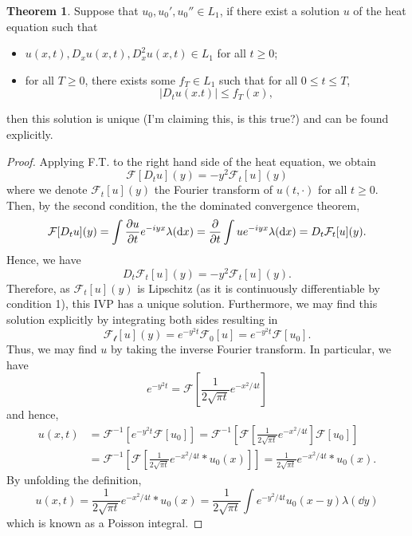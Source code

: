 \documentclass[]{article}
\theoremstyle{definition}
\newtheorem{theorem}{Theorem}
\theoremstyle{definition}
\begin{document}
\begin{theorem}
  Suppose that \(u_0, u_0', u_0'' \in L_1\), if there exist a solution \(u\) of the 
  heat equation such that 
  \begin{itemize}
    \item \(u(x, t), D_x u(x ,t), D^2_x u(x, t) \in L_1\) for all \(t \ge 0\);
    \item for all \(T \ge 0\), there exists some \(f_T \in L_1\) such that 
      for all \(0 \le t \le T\),
      \[|D_t u(x. t)| \le f_T(x),\]
  \end{itemize}
  then this solution is unique (I'm claiming this, is this true?) 
  and can be found explicitly.
\end{theorem}
\begin{proof}
  Applying F.T. to the right hand side of the heat equation, we obtain 
  \[\mathcal{F}[D_t u](y) = -y^2 \mathcal{F}_t[u](y)\]
  where we denote \(\mathcal{F}_t[u](y)\) the Fourier transform of \(u(t, \cdot)\) 
  for all \(t \ge 0\). Then, by the second condition, the the dominated 
  convergence theorem, 
  \[\mathcal{F}[D_t u](y) = \int \pdv{u}{t} e^{-iyx} \lambda(\dd x) 
    = \pdv{t} \int ue^{-iy x} \lambda(\dd x) = D_t \mathcal{F}_t[u](y).\]
  Hence, we have 
  \[D_t \mathcal{F}_t[u](y) = -y^2 \mathcal{F}_t[u](y).\]
  Therefore, as \(\mathcal{F}_t[u](y)\) is Lipschitz (as it is continuously 
  differentiable by condition 1), this IVP has a unique solution. Furthermore, 
  we may find this solution explicitly by integrating both sides resulting in 
  \[\mathcal{F_t}[u](y) = e^{-y^2 t}\mathcal{F}_0[u] = e^{-y^2 t}\mathcal{F}[u_0].\]
  Thus, we may find \(u\) by taking the inverse Fourier transform. In particular, 
  we have 
  \[e^{-y^2 t} = \mathcal{F}\left[\frac{1}{2\sqrt{\pi t}} e^{-x^2 / 4t}\right]\]
  and hence, 
  \[\begin{split}
    u(x, t) & = \mathcal{F}^{-1}[e^{-y^2 t}\mathcal{F}[u_0]] = 
    \mathcal{F}^{-1}\left[\mathcal{F}\left[\frac{1}{2\sqrt{\pi t}} e^{-x^2 / 4t}\right]\mathcal{F}[u_0]\right]\\
    & = \mathcal{F}^{-1}\left[\mathcal{F}\left[\frac{1}{2\sqrt{\pi t}} e^{-x^2 / 4t} * u_0(x)\right]\right]
      = \frac{1}{2\sqrt{\pi t}} e^{-x^2 / 4t} * u_0(x).
  \end{split}\]
  By unfolding the definition, 
  \[u(x, t) = \frac{1}{2\sqrt{\pi t}} e^{-x^2 / 4t} * u_0(x) 
  = \frac{1}{2\sqrt{\pi t}} \int e^{- y^2 / 4t}u_0(x - y) \lambda(\dd y)\]
  which is known as a Poisson integral.
\end{proof}
\end{document}
